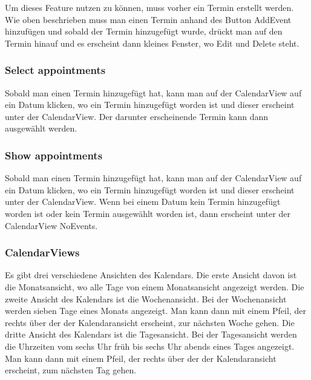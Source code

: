 \documentclass[12pt]{scrartcl}
\begin{document}
        Um dieses Feature nutzen zu können, muss vorher ein Termin erstellt werden. Wie oben beschrieben muss man einen Termin
        anhand des Button AddEvent hinzufügen und sobald der Termin hinzugefügt wurde, drückt man auf den Termin hinauf und
        es erscheint dann kleines Fenster, wo Edit und Delete steht.   

    \subsubsection{Select appointments}
        Sobald man einen Termin hinzugefügt hat, kann man auf der CalendarView auf ein Datum klicken, wo ein Termin
        hinzugefügt worden ist und dieser erscheint unter der CalendarView. Der darunter erscheinende Termin kann dann 
        ausgewählt werden.
    
    \subsubsection{Show appointments}
        Sobald man einen Termin hinzugefügt hat, kann man auf der CalendarView auf ein Datum klicken, wo ein Termin
        hinzugefügt worden ist und dieser erscheint unter der CalendarView. Wenn bei einem Datum kein Termin hinzugefügt    
        worden ist oder kein Termin ausgewählt worden ist, dann erscheint unter der CalendarView NoEvents.
            
    \subsubsection{CalendarViews}
        Es gibt drei verschiedene Ansichten des Kalendars. Die erste Ansicht davon ist die Monatsansicht, wo alle Tage von
        einem Monatsansicht angezeigt werden. Die zweite Ansicht des Kalendars ist die Wochenansicht. Bei der Wochenansicht
        werden sieben Tage eines Monats angezeigt. Man kann dann mit einem Pfeil, der rechts über der der Kalendaransicht
        erscheint, zur nächsten Woche gehen. Die dritte Ansicht des Kalendars ist die Tagesansicht. Bei der Tagesansicht
        werden die Uhrzeiten vom sechs Uhr früh bis sechs Uhr abends eines Tages angezeigt. Man kann dann mit einem Pfeil, 
        der rechts über der der Kalendaransicht erscheint, zum nächsten Tag gehen.
\end{document}
